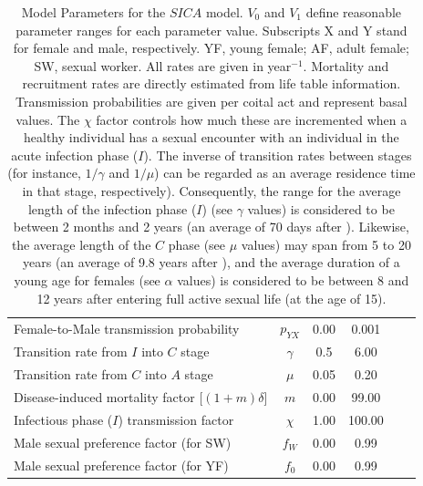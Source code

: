 \documentclass[preprint,12pt]{elsarticle}
\begin{document}
\begin{table}
\begin{tabular}{p{7.0cm}ccccc}
{\small Female-to-Male transmission probability}           & $p_{YX}$    & 0.00 & 0.001   & \cite{Patel2014,Wawer2005,Gray2001} \\  
{\small Transition rate from $I$ into $C$ stage}           & $\gamma$    & 0.5  & 6.00    & \cite{Fiebig2003}\\
{\small Transition rate from $C$ into $A$ stage}           & $\mu$       & 0.05 & 0.20    & \cite{Bacchetti1989}\\
{\small Disease-induced mortality factor [$(1+m)\delta$}]   & $m$         & 0.00 & 99.00   & \\ 
{\small Infectious phase ($I$) transmission factor}        & $\chi$      & 1.00 & 100.00   & \cite{Pinkerton2008}\\
{\small Male sexual preference factor (for SW)}            & $f_W$       & 0.00 & 0.99     & \\
{\small Male sexual preference factor (for YF)}            & $f_0$       & 0.00 & 0.99     & \\
\hline\hline
\end{tabular}
\caption{Model Parameters for the $SICA$ model. $V_0$ and $V_1$ define reasonable parameter ranges for each parameter value. Subscripts X and Y stand for female and male, respectively. YF, young female; AF, adult female; SW, sexual worker. All rates are given in year$^{-1}$. Mortality and recruitment rates are directly estimated from life table information. Transmission probabilities are given per coital act and represent basal values. The $\chi$ factor controls how much these are incremented when a healthy individual has a sexual encounter with an individual in the acute infection phase ($I$). The inverse of transition rates between stages (for instance, $1/\gamma$ and $1/\mu$) can be regarded as an average residence time in that stage, respectively). Consequently, the range for the average length of the infection phase ($I$) (see $\gamma$ values) is considered to be between 2 months and 2 years (an average of 70 days after \cite{Fiebig2003}). Likewise, the average length of the $C$ phase (see $\mu$ values) may span from 5 to 20 years (an average of 9.8 years after \cite{Bacchetti1989}), and the average duration of a young age for females (see $\alpha$ values) is considered to be between 8 and 12 years after entering full active sexual life (at the age of 15).}
\label{T1:Parameter_Values}
\end{table}
\end{document}

